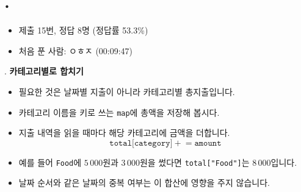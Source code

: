 
\section{\texorpdfstring{\pletter. \ptitle}{문제 \pletter}}

\begin{frame}[label=problem-D]
    \sectiontitle{\pletter}{\ptitle}
    \begin{itemize}
        \item 제출 15번, 정답 8명 (정답률 53.3\%)
        \item 처음 푼 사람: ㅇㅎㅈ (00:09:47)
    \end{itemize}
\end{frame}

\begin{frame}{\textbf{\pletter}. \ptitle}
    \textbf{카테고리별로 합치기}
\begin{itemize}
        \item 필요한 것은 날짜별 지출이 아니라 카테고리별 총지출입니다.
        \item 카테고리 이름을 키로 쓰는 \texttt{map}에 총액을 저장해 봅시다.
        \item 지출 내역을 읽을 때마다 해당 카테고리에 금액을 더합니다.
        \[
            \texttt{total[category]}\mathrel{+}=\texttt{amount}
        \]
        \item 예를 들어 \texttt{Food}에 $5\,000$원과 $3\,000$원을 썼다면 \texttt{total["Food"]}는 $8\,000$입니다.
        \item 날짜 순서와 같은 날짜의 중복 여부는 이 합산에 영향을 주지 않습니다.
    \end{itemize}
\end{frame}

